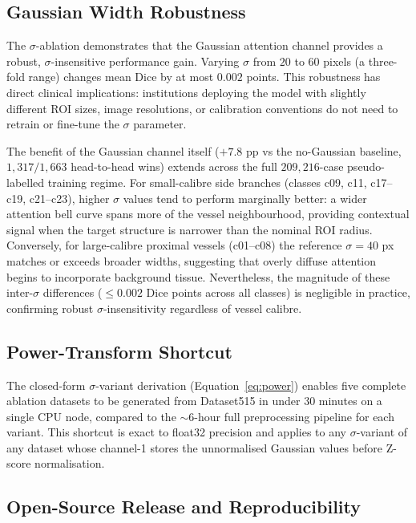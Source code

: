 \documentclass[12pt]{article}
\begin{document}
\subsection{Gaussian Width Robustness}

The $\sigma$-ablation demonstrates that the Gaussian attention channel
provides a robust, $\sigma$-insensitive performance gain. Varying $\sigma$
from $20$ to $60$ pixels (a three-fold range) changes mean Dice by at most
$0.002$ points. This robustness has direct clinical implications: institutions
deploying the model with slightly different ROI sizes, image resolutions, or
calibration conventions do not need to retrain or fine-tune the $\sigma$
parameter.

The benefit of the Gaussian channel itself ($+7.8$ pp vs the no-Gaussian
baseline, $1{,}317/1{,}663$ head-to-head wins) extends across the full
$209{,}216$-case pseudo-labelled training regime.
For small-calibre side branches (classes c09, c11, c17--c19, c21--c23),
higher $\sigma$ values tend to perform marginally better: a wider attention
bell curve spans more of the vessel neighbourhood, providing contextual
signal when the target structure is narrower than the nominal ROI radius.
Conversely, for large-calibre proximal vessels (c01--c08) the reference
$\sigma{=}40$ px matches or exceeds broader widths, suggesting that overly
diffuse attention begins to incorporate background tissue. Nevertheless,
the magnitude of these inter-$\sigma$ differences ($\leq0.002$ Dice points
across all classes) is negligible in practice, confirming robust
$\sigma$-insensitivity regardless of vessel calibre.

\subsection{Power-Transform Shortcut}

The closed-form $\sigma$-variant derivation (Equation~\ref{eq:power}) enables
five complete ablation datasets to be generated from Dataset515 in under
30 minutes on a single CPU node, compared to the ${\sim}6$-hour full
preprocessing pipeline for each variant. This shortcut is exact to float32
precision and applies to any $\sigma$-variant of any dataset whose channel-1
stores the unnormalised Gaussian values before Z-score normalisation.

\subsection{Open-Source Release and Reproducibility}
\end{document}
